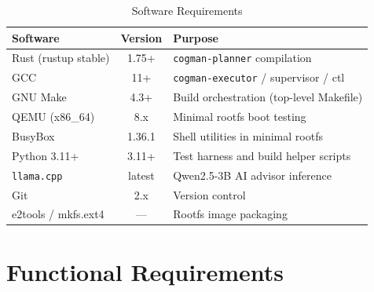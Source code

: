 \documentclass[12pt,a4paper]{report}
\begin{document}
\begin{table}[H]
\centering
\caption{Software Requirements}
\renewcommand{\arraystretch}{1.25}
\begin{tabularx}{\linewidth}{l c X}
\toprule
\textbf{Software}        & \textbf{Version} & \textbf{Purpose}\\
\midrule
Rust (rustup stable)     & 1.75+   & \texttt{cogman-planner} compilation\\
GCC                      & 11+     & \texttt{cogman-executor} / supervisor / ctl\\
GNU Make                 & 4.3+    & Build orchestration (top-level Makefile)\\
QEMU (x86\_64)           & 8.x     & Minimal rootfs boot testing\\
BusyBox                  & 1.36.1  & Shell utilities in minimal rootfs\\
Python 3.11+             & 3.11+   & Test harness and build helper scripts\\
\texttt{llama.cpp}       & latest  & Qwen2.5-3B AI advisor inference\\
Git                      & 2.x     & Version control\\
e2tools / mkfs.ext4      & ---     & Rootfs image packaging\\
\bottomrule
\end{tabularx}
\end{table}

\section{Functional Requirements}
\end{document}

